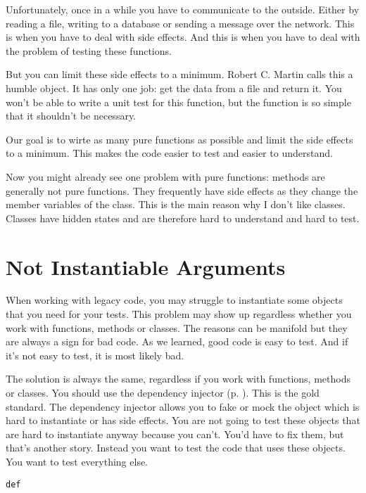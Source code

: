 Unfortunately, once in a while you have to communicate to the outside. Either by reading a file, writing to a database or sending a message over the network. This is when you have to deal with side effects. And this is when you have to deal with the problem of testing these functions.

But you can limit these side effects to a minimum. Robert C. Martin calls this a humble object. It has only one job: get the data from a file and return it. You won't be able to write a unit test for this function, but the function is so simple that it shouldn't be necessary.

Our goal is to wirte as many pure functions as possible and limit the side effects to a minimum. This makes the code easier to test and easier to understand.

Now you might already see one problem with pure functions: methods are generally not pure functions. They frequently have side effects as they change the member variables of the class. This is the main reason why I don't like classes. Classes have hidden states and are therefore hard to understand and hard to test.

\section{Not Instantiable Arguments}

When working with legacy code, you may struggle to instantiate some objects that you need for your tests. This problem may show up regardless whether you work with functions, methods or classes. The reasons can be manifold but they are always a sign for bad code. As we learned, good code is easy to test. And if it's not easy to test, it is most likely bad. 

The solution is always the same, regardless if you work with functions, methods or classes. You should use the dependency injector (p. \pageref{sec:dependency_injector}). This is the gold standard. The dependency injector allows you to fake or mock the object which is hard to instantiate or has side effects. You are not going to test these objects that are hard to instantiate anyway because you can't. You'd have to fix them, but that's another story. Instead you want to test the code that uses these objects. You want to test everything else.

\begin{programcode}{}
\begin{verbatim}
def 

\end{verbatim}
\end{programcode}

